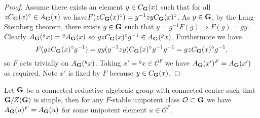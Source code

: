 \documentclass{jt-calcs}
\begin{document}
\begin{proof}
Assume there exists an element $y \in C_{\mathbf{G}}(x)$ such that for all $zC_{\mathbf{G}}(x)^{\circ} \in A_{\mathbf{G}}(x)$ we have\linebreak $F(zC_{\mathbf{G}}(x)^{\circ}) = y^{-1}zyC_{\mathbf{G}}(x)^{\circ}$. As $y \in \mathbf{G}$, by the Lang-Steinberg theorem, there exists $g \in \mathbf{G}$ such that $y = g^{-1}F(g) \Rightarrow F(g) = gy$. Clearly $A_{\mathbf{G}}({}^gx) = {}^gA_{\mathbf{G}}(x)$ so $gzC_{\mathbf{G}}(x)^{\circ}g^{-1} \in A_{\mathbf{G}}({}^gx)$. Furthermore we have
\begin{equation*}
F(gzC_{\mathbf{G}}(x)^{\circ}g^{-1}) = gy(y^{-1}zy)C_{\mathbf{G}}(x)^{\circ}y^{-1}g^{-1} = gzC_{\mathbf{G}}(x)^{\circ}g^{-1},
\end{equation*}
so $F$ acts trivially on $A_{\mathbf{G}}({}^gx)$. Taking $x' = {}^gx \in \mathcal{C}^F$ we have $A_{\mathbf{G}}(x')^F = A_{\mathbf{G}}(x')$ as required. Note $x'$ is fixed by $F$ because $y \in C_{\mathbf{G}}(x)$.
\end{proof}

\begin{prop}\label{thm:triv-comp-action-adj}
Let $\mathbf{G}$ be a connected reductive algebraic group with connected centre such that $\mathbf{G}/Z(\mathbf{G})$ is simple, then for any $F$-stable unipotent class $\mathcal{O} \subset \mathbf{G}$ we have $A_{\mathbf{G}}(u)^F = A_{\mathbf{G}}(u)$ for some unipotent element $u \in \mathcal{O}^F$.
\end{prop}
\end{document}

